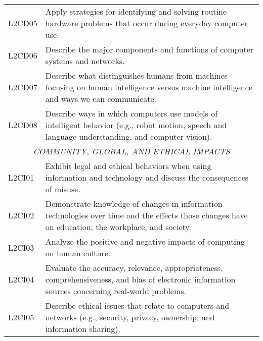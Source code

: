 \begin{longtable}{p{1.8cm}p{11cm}}
 L2CD05  & Apply strategies for identifying and solving routine hardware problems that occur during everyday computer use.                                                                                                            \\
 L2CD06  & Describe the major components and functions of computer systems and networks.                                                                                                                                              \\
 L2CD07  & Describe what distinguishes humans from machines focusing on human intelligence versus machine intelligence and ways we can communicate.                                                                                   \\
 L2CD08  & Describe ways in which computers use models of intelligent behavior (e.g., robot motion, speech and language understanding, and computer vision).                                                                          \\
 \multicolumn{2}{c}{\textit{COMMUNITY, GLOBAL, AND ETHICAL IMPACTS}}                                                                                                                                                                                 \\
 L2CI01  & Exhibit legal and ethical behaviors when using information and technology and discuss the consequences of misuse.                                                                                                          \\
 L2CI02  & Demonstrate knowledge of changes in information technologies over time and the effects those changes have on education, the workplace, and society.                                                                        \\
 L2CI03  & Analyze the positive and negative impacts of computing on human culture.                                                                                                                                                   \\
 L2CI04  & Evaluate the accuracy, relevance, appropriateness, comprehensiveness, and bias of electronic information sources concerning real-world problems.                                                                           \\
 L2CI05  & Describe ethical issues that relate to computers and networks (e.g., security, privacy, ownership, and information sharing).                                                                                               \\

\end{longtable}
